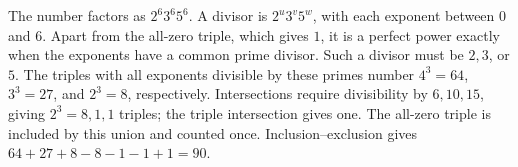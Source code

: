 The number factors as $2^6 3^6 5^6$. A divisor is $2^u3^v5^w$, with each exponent between $0$ and $6$. Apart from the all-zero triple, which gives $1$, it is a perfect power exactly when the exponents have a common prime divisor. Such a divisor must be $2,3$, or $5$. The triples with all exponents divisible by these primes number $4^3=64$, $3^3=27$, and $2^3=8$, respectively. Intersections require divisibility by $6,10,15$, giving $2^3=8,1,1$ triples; the triple intersection gives one. The all-zero triple is included by this union and counted once. Inclusion--exclusion gives $64+27+8-8-1-1+1=\boxed{90}$.
